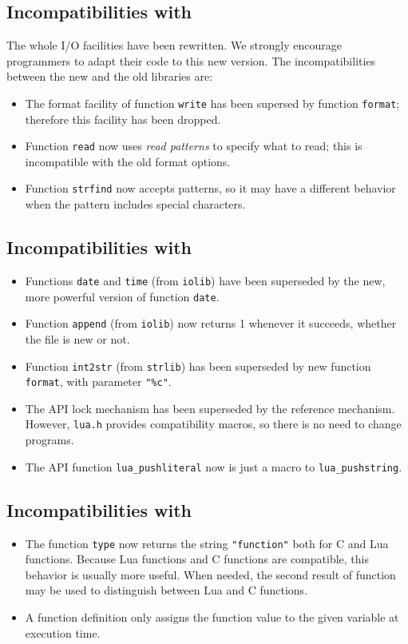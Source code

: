 \subsection*{Incompatibilities with }
The whole I/O facilities have been rewritten.
We strongly encourage programmers to adapt their code
to this new version.
The incompatibilities between the new and the old libraries are:
\begin{itemize}
\item The format facility of function \verb|write| has been supersed by
function \verb|format|;
therefore this facility has been dropped.
\item Function \verb|read| now uses \emph{read patterns} to specify
what to read;
this is incompatible with the old format options.
\item Function \verb|strfind| now accepts patterns,
so it may have a different behavior when the pattern includes
special characters.
\end{itemize}

\subsection*{Incompatibilities with }
\begin{itemize}
\item
Functions \verb|date| and \verb|time| (from \verb|iolib|)
have been superseded by the new, more powerful version of function \verb|date|.
\item
Function \verb|append| (from \verb|iolib|) now returns 1 whenever it succeeds,
whether the file is new or not.
\item
Function \verb|int2str| (from \verb|strlib|) has been superseded by new
function \verb|format|, with parameter \verb|"%c"|.
\item
The API lock mechanism has been superseded by the reference mechanism.
However, \verb|lua.h| provides compatibility macros,
so there is no need to change programs.
\item
The API function \verb|lua_pushliteral| now is just a macro to
\verb|lua_pushstring|.
\end{itemize}

\subsection*{Incompatibilities with }
\begin{itemize}
\item
The function \verb|type| now returns the string \verb|"function"|
both for C and Lua functions.
Because Lua functions and C functions are compatible,
this behavior is usually more useful.
When needed, the second result of function  may be used
to distinguish between Lua and C functions.
\item
A function definition only assigns the function value to the
given variable at execution time.
\end{itemize}

